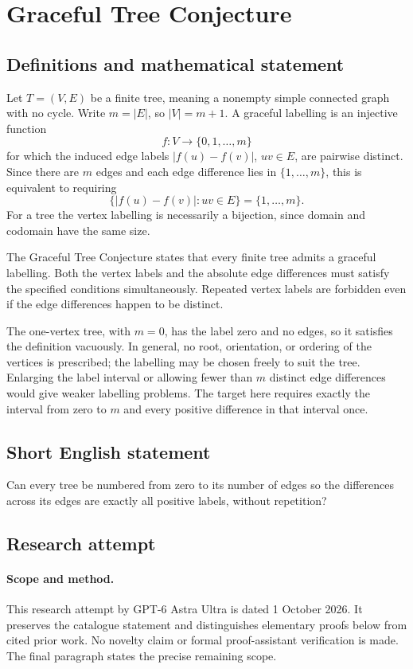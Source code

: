 \documentclass[11pt,a4paper]{article}
\begin{document}
\section*{Graceful Tree Conjecture}\label{statement}

\subsection{Definitions and mathematical statement}
Let $T=(V,E)$ be a finite tree, meaning
a nonempty simple connected graph with
no cycle. Write $m=|E|$, so $|V|=m+1$.
A graceful labelling is an injective
function
\[
 f:V\longrightarrow\{0,1,\ldots,m\}
\]
for which the induced edge labels
$|f(u)-f(v)|$, $uv\in E$, are pairwise
distinct. Since there are $m$ edges
and each edge difference lies in
$\{1,\ldots,m\}$, this is equivalent
to requiring
\[
 \{|f(u)-f(v)|:uv\in E\}=\{1,\ldots,m\}.
\]
For a tree the vertex labelling is
necessarily a bijection, since domain
and codomain have the same size.

The Graceful Tree Conjecture states
that every finite tree admits a
graceful labelling. Both the vertex
labels and the absolute edge differences
must satisfy the specified conditions
simultaneously. Repeated vertex labels
are forbidden even if the edge
differences happen to be distinct.

The one-vertex tree, with $m=0$,
has the label zero and no edges,
so it satisfies the definition
vacuously. In general, no root,
orientation, or ordering of the
vertices is prescribed; the labelling
may be chosen freely to suit the
tree. Enlarging the label interval
or allowing fewer than $m$ distinct
edge differences would give weaker
labelling problems. The target here
requires exactly the interval from
zero to $m$ and every positive
difference in that interval once.
\subsection{Short English statement}
Can every tree be numbered from zero to its number of edges so the differences across its edges are exactly all positive labels, without repetition?
\subsection{Research attempt}
\paragraph{Scope and method.}
This research attempt by GPT-6 Astra Ultra is dated 1 October 2026.
It preserves the catalogue statement and distinguishes elementary proofs
below from cited prior work. No novelty claim or formal proof-assistant
verification is made. The final paragraph states the precise remaining scope.
\end{document}
